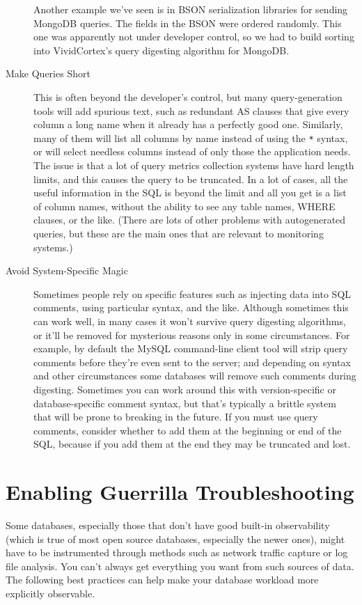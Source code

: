 \documentclass{vivid_layout}
\begin{document}
\begin{description}
Another example we've seen is in BSON serialization libraries for sending
MongoDB queries. The fields in the BSON were ordered randomly. This one was
apparently not under developer control, so we had to build sorting into
VividCortex's query digesting algorithm for MongoDB.

\item[Make Queries Short] This is often beyond the developer's control, but many
query-generation tools will add spurious text, such as redundant AS clauses that
give every column a long name when it already has a perfectly good one.
Similarly, many of them will list all columns by name instead of using the
\texttt{*} syntax, or will select needless columns instead of only those the
application needs. The issue is that a lot of query metrics collection systems
have hard length limits, and this causes the query to be truncated. In a lot of
cases, all the useful information in the SQL is beyond the limit and all you get
is a list of column names, without the ability to see any table names, WHERE
clauses, or the like. (There are lots of other problems with autogenerated
queries, but these are the main ones that are relevant to monitoring systems.)

\item[Avoid System-Specific Magic] Sometimes people rely on specific features
such as injecting data into SQL comments, using particular syntax, and the like.
Although sometimes this can work well, in many cases it won't survive query
digesting algorithms, or it'll be removed for mysterious reasons
only in some circumstances. For example, by default the MySQL command-line
client tool will strip query comments before they're even sent to the server;
and depending on syntax and other circumstances some databases will remove such
comments during digesting. Sometimes you can work around this with
version-specific or database-specific comment syntax, but that's typically a
brittle system that will be prone to breaking in the future. If you must use
query comments, consider whether to add them at the beginning or end of the SQL,
because if you add them at the end they may be truncated and lost.

\end{description}

\section{Enabling Guerrilla Troubleshooting}

Some databases, especially those that don't have good built-in observability
(which is true of most open source databases, especially the newer ones), might
have to be instrumented through methods such as network traffic capture or log file
analysis. You can't always get everything you want from such sources of data.
The following best practices can help make your database workload more
explicitly observable.
\end{document}
